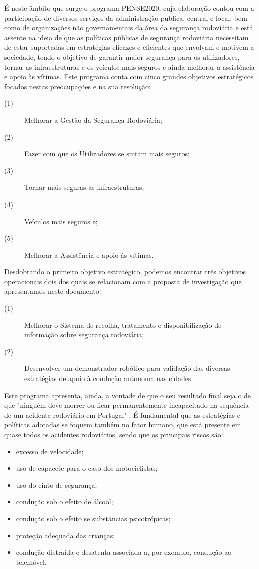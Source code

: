 \documentclass[a4paper,10pt]{texRel}
\begin{document}
É neste âmbito que surge o programa PENSE2020, cuja elaboração contou com a participação de diversos serviços da administração publica, central e local, bem como de organizações não governamentais da área da segurança rodoviária e está assente na ideia de que as políticas públicas de segurança rodoviária necessitam de estar suportadas em estratégias eficazes e eficientes que envolvam e motivem a sociedade, tendo o objetivo de garantir maior segurança para os utilizadores, tornar as infraestruturas e os veículos mais seguros e ainda melhorar a assistência e apoio às vítimas. Este programa conta com cinco grandes objetivos estratégicos focados nestas preocupações e na sua resolução: 
\begin{description}
	\item [(1)] Melhorar a Gestão da Segurança Rodoviária; 
	\item [(2)] Fazer com que os Utilizadores se sintam mais seguros; 
	\item [(3)] Tornar mais seguras as infraestruturas; 
	\item [(4)] Veículos mais seguros e; 
	\item [(5)] Melhorar a Assistência e apoio ás vítimas. 
\end{description}

Desdobrando o primeiro objetivo estratégico, podemos encontrar três objetivos operacionais dois dos quais se relacionam com a proposta de investigação que apresentamos neste documento: 
\begin{description}
\item[(1)] Melhorar o Sistema de recolha, tratamento e disponibilização de informação sobre segurança rodoviária; 
\item[(2)] Desenvolver um demonstrador robótico para validação das diversas estratégias de apoio à condução autonoma nas cidades.
\end{description} 
Este programa apresenta, ainda, a vontade de que o seu resultado final seja o de que "ninguém deve morrer ou ficar permanentemente incapacitado na sequência de um acidente rodoviário em Portugal"  \cite{DR}.
É fundamental que as estratégias e políticas adotadas se foquem também no fator humano, que está presente em quase todos os acidentes rodoviários, sendo que os principais riscos são: 
\begin{itemize}
\item   excesso de velocidade;
\item   uso de capacete para o caso dos motociclistas;
\item 	uso do cinto de segurança;
\item	condução sob o efeito de álcool; 
\item 	condução sob o efeito se substâncias psicotrópicas; 
\item	proteção adequada das crianças;
\item   condução distraída e desatenta associada a, por exemplo, condução ao telemóvel. 
\end{itemize}
\end{document}
